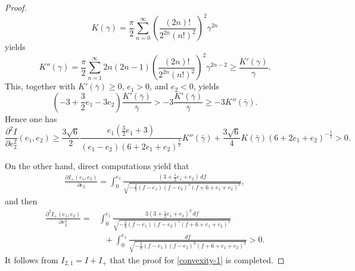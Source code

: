 \documentclass[reqno,12pt]{amsart}
\begin{document}
{\begin{proof}
\begin{equation*}
    K(\gamma) = \frac{\pi}{2}\sum_{n=0}^{\infty}\left(\frac{(2n)!}{2^{2n}(n!)^2}\right)^2 \gamma^{2n}
\end{equation*}
yields
\begin{equation*}
    K''(\gamma) = \frac{\pi}{2}\sum_{n=1}^{\infty} 2n(2n-1)\left(\frac{(2n)!}{2^{2n}(n!)^2}\right)^2 \gamma^{2n-2}\geq \frac{ K'(\gamma) }{\gamma}.
\end{equation*}
This, together with 
$K'(\bar{\gamma})\geq 0$, $e_1>0$, and $e_2<0$, yields $$\left(-3+\frac{3}{2}e_1-3e_2\right) \frac{K'(\bar{\gamma})}{\bar{\gamma}} > -3\frac{K'(\bar{\gamma})}{\bar{\gamma}} \geq -3 K''(\bar{\gamma}).$$ 
Hence one has
\begin{equation}\label{eq:convex1}
    \frac{\partial^2 I }{\partial e_2^2} (e_1,e_2) \geq  \frac{3\sqrt{6}}{2}\frac{e_1(\frac{3}{2}e_1+3)}{(e_1-e_2)(6+2e_1+e_2)^{\frac{7}{2}}} K''(\bar{\gamma})+ \frac{3\sqrt{6}}{4}K(\bar{\gamma})(6+2e_1+e_2)^{-\frac{5}{2}}
    >0.
\end{equation}

 On the other hand, 
 direct computations yield that 
\begin{equation}\label{eq:deriofI+e2}
    \begin{aligned}
    \frac{\partial I_+(e_1,e_2)}{\partial e_2} 
=  \int_0^{e_1}  \frac{(3+ \frac12 e_1 + e_2) \, df}{\sqrt{-\frac23 (f-e_1)(f-e_2)^3 (f+ 6 +e_1 +e_2)^3}},  
    \end{aligned}
\end{equation}
and then
\begin{equation*}\label{eq:convex2}
    \begin{aligned}
    \frac{\partial^2 I_+(e_1,e_2)}{\partial e_2^2} = & \int_0^{e_1} \frac{3(3+ \frac12 e_1 + e_2)^2 \, df }{\sqrt{-\frac23 (f-e_1) (f-e_2)^5 (f+6+e_1 +e_2)^5}} \\
    &~\ \  + \int_0^{e_1}  \frac{df}{\sqrt{-\frac23 (f-e_1) (f-e_2)^3 (f+6+e_1 +e_2)^3}} >0.
    \end{aligned}
\end{equation*}
It follows from $I_{2,1}= I+I_+$ that the proof for \eqref{convexity-1} is completed. 
 \end{proof}

}
\end{document}
